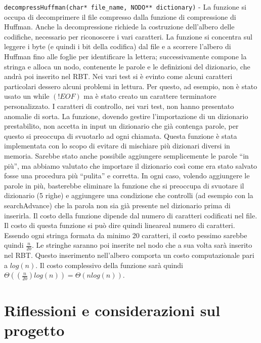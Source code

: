 \documentclass[paper=a4, fontsize=11pt,twoside]{scrartcl}   %
\begin{document}
				\texttt{decompressHuffman(char* file\_name, NODO** dictionary)} - La funzione si occupa di decomprimere il file compresso dalla funzione di compressione di Huffman. Anche la decompressione richiede la costruzione dell’albero delle codifiche, necessario per riconoscere i vari caratteri. La funzione si concentra sul leggere i byte (e quindi i bit della codifica) dal file e a scorrere l’albero di Huffman fino alle foglie per identificare la lettera; successivamente compone la stringa e alloca un nodo, contenente le parole e le definizioni del dizionario, che andrà poi inserito nel RBT. Nei vari test si è evinto come alcuni caratteri particolari dessero alcuni problemi in lettura. Per questo, ad esempio, non è stato usato un while $(!EOF)$ ma è stato creato un carattere terminatore personalizzato. I caratteri di controllo, nei vari test, non hanno presentato anomalie di sorta. La funzione, dovendo gestire l’importazione di un dizionario prestabilito, non accetta in input un dizionario che già contenga parole, per questo si preoccupa di svuotarlo ad ogni chiamata. Questa funzione è stata implementata con lo scopo di evitare di mischiare più dizionari diversi in memoria. Sarebbe stato anche possibile aggiungere semplicemente le parole “in più”, ma abbiamo valutato che importare il dizionario così come era stato salvato fosse una procedura più “pulita” e corretta. In ogni caso, volendo aggiungere le parole in più, basterebbe eliminare la funzione che si preoccupa di svuotare il dizionario (5 righe) e aggiungere una condizione che controlli (ad esempio con la searchAdvance) che la parola non sia già presente nel dizionario prima di inserirla. Il costo della funzione dipende dal numero di caratteri codificati nel file. Il costo di questa funzione si può dire quindi lineareal numero di caratteri. Essendo ogni stringa formata da minimo 20 caratteri, il costo pessimo sarebbe quindi $\frac{n}{20}$. Le stringhe saranno poi inserite nel nodo che a sua volta sarà inserito nel RBT. Questo inserimento nell'albero comporta un costo computazionale pari a $log(n)$. Il costo complessivo della funzione sarà quindi $\Theta((\frac{n}{20})log(n)) = \Theta(nlog(n))$. 
			\pagebreak
		\section{Riflessioni e considerazioni sul progetto}
\end{document}
